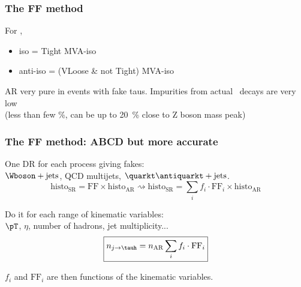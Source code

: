 \begin{frame}
\frametitle{The FF method}

For \tauh,
\begin{itemize}
\item iso = Tight MVA-iso
\item anti-iso = (VLoose \& not Tight) MVA-iso
\end{itemize}

\manip AR very pure in events with fake taus.
\manip Impurities from actual \tauh\ decays are very low\\(less than few \%, can be up to \SI{20}{\%} close to Z boson mass peak)
\end{frame}

\begin{frame}
\frametitle{The FF method: ABCD but more accurate}
\manip One DR for each process giving fakes:\\$\Wboson+\text{jets}$, QCD multijets, $\quarkt\antiquarkt+\text{jets}$.
\begin{equation*}
\text{histo}_\text{SR} = \mathrm{FF} \times \text{histo}_\text{AR}
\rightsquigarrow
\text{histo}_\text{SR} =\sum_i f_i \cdot \mathrm{FF}_i \times \text{histo}_\text{AR}
\end{equation*}

\pause
\manip Do it for each range of kinematic variables:\\
\qquad $\pT$, $\eta$, number of hadrons, jet multiplicity...
\begin{equation*}
\boxed{n_{j\to\tauh} = n_\text{AR}\sum_i f_i \cdot \mathrm{FF}_i}
\end{equation*}

\pause
\manip $f_i$ and $\mathrm{FF}_i$ are then functions of the kinematic variables.
\end{frame}


